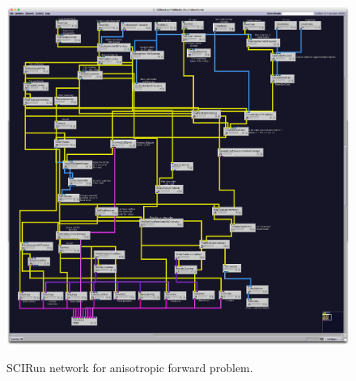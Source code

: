 \begin{figure}[p]
\begin{center}
\includegraphics[width=\textwidth]{Figures/aniso_network.png}\\
\caption{SCIRun network for anisotropic forward problem.}
\label{fig:anisofornet}
\end{center}
\end{figure}

